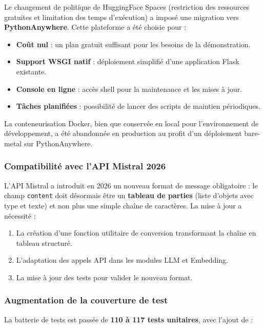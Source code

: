 Le changement de politique de HuggingFace Spaces (restriction des ressources gratuites et limitation des temps d'exécution) a imposé une migration vers \textbf{PythonAnywhere}. Cette plateforme a été choisie pour :

\begin{itemize}
    \item \textbf{Coût nul} : un plan gratuit suffisant pour les besoins de la démonstration.
    \item \textbf{Support WSGI natif} : déploiement simplifié d'une application Flask existante.
    \item \textbf{Console en ligne} : accès shell pour la maintenance et les mises à jour.
    \item \textbf{Tâches planifiées} : possibilité de lancer des scripts de maintien périodiques.
\end{itemize}

La conteneurisation Docker, bien que conservée en local pour l'environnement de développement, a été abandonnée en production au profit d'un déploiement bare-metal sur PythonAnywhere.

\subsubsection{Compatibilité avec l'API Mistral 2026}

L'API Mistral a introduit en 2026 un nouveau format de message obligatoire : le champ \texttt{content} doit désormais être un \textbf{tableau de parties} (liste d'objets avec type et texte) et non plus une simple chaîne de caractères. La mise à jour a nécessité :

\begin{enumerate}
    \item La création d'une fonction utilitaire de conversion transformant la chaîne en tableau structuré.
    \item L'adaptation des appels API dans les modules LLM et Embedding.
    \item La mise à jour des tests pour valider le nouveau format.
\end{enumerate}

\subsubsection{Augmentation de la couverture de test}

La batterie de tests est passée de \textbf{110 à 117 tests unitaires}, avec l'ajout de :

